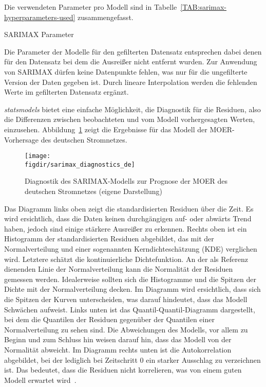 Die verwendeten Parameter pro Modell sind in Tabelle~\ref{TAB:sarimax-hyperparameters-used} zusammengefasst.
\begin{table}[t]
 \centering\small
 \caption{SARIMAX Parameter}
 \label{TAB:sarimax-hyperparameters-used}
 
\end{table}

Die Parameter der Modelle für den gefilterten Datensatz entsprechen dabei denen für den Datensatz bei dem die Ausreißer nicht entfernt wurden.
Zur Anwendung von \ac{SARIMAX} dürfen keine Datenpunkte fehlen, was nur für die ungefilterte Version der Daten gegeben ist.
Durch lineare Interpolation werden die fehlenden Werte im gefilterten Datensatz ergänzt.

\textit{statsmodels} bietet eine einfache Möglichkeit, die Diagnostik für die Residuen, also die Differenzen zwischen beobachteten und vom Modell vorhergesagten Werten, einzusehen.
Abbildung~\ref{FIG:sarimax_diagnostics_de} zeigt die Ergebnisse für das Modell der \ac{MOER}-Vorhersage des deutschen Stromnetzes.
\begin{figure}
 \caption[SARIMAX Diagnostik MOER Deutschland]{Diagnostik des SARIMAX-Modells zur Prognose der MOER des deutschen Stromnetzes (eigene Darstellung)}
 {\texttt{[image: \\figdir/sarimax\_diagnostics\_de]}}
 \label{FIG:sarimax_diagnostics_de}
\end{figure}
Das Diagramm links oben zeigt die standardisierten Residuen über die Zeit.
Es wird ersichtlich, dass die Daten keinen durchgängigen auf- oder abwärts Trend haben, jedoch sind einige stärkere Ausreißer zu erkennen.
Rechts oben ist ein Histogramm der standardisierten Residuen abgebildet, das mit der Normalverteilung und einer sogenannten Kerndichteschätzung (KDE) verglichen wird.
Letztere schätzt die kontinuierliche Dichtefunktion.
An der als Referenz dienenden Linie der Normalverteilung kann die Normalität der Residuen gemessen werden.
Idealerweise sollten sich die Histogramme und die Spitzen der Dichte mit der Normalverteilung decken.
Im Diagramm wird ersichtlich, dass sich die Spitzen der Kurven unterscheiden, was darauf hindeutet, dass das Modell Schwächen aufweist.
Links unten ist das Quantil-Quantil-Diagramm dargestellt, bei dem die Quantilen der Residuen gegenüber der Quantilen einer Normalverteilung zu sehen sind.
Die Abweichungen des Modells, vor allem zu Beginn und zum Schluss hin weisen darauf hin, dass das Modell von der Normalität abweicht.
Im Diagramm rechts unten ist die Autokorrelation abgebildet, bei der lediglich bei Zeitschritt 0 ein starker Ausschlag zu verzeichnen ist.
Das bedeutet, dass die Residuen nicht korrelieren, was von einem guten Modell erwartet wird~\cite{Peixeiro.2022}.

